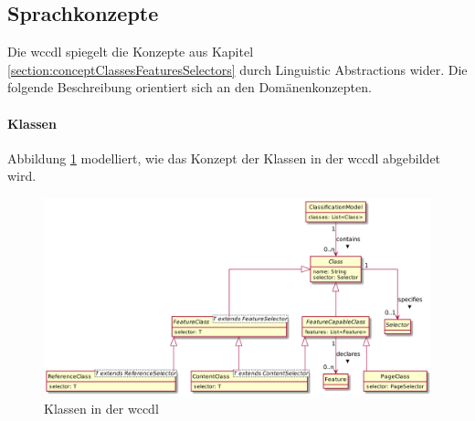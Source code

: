 \subsection{Sprachkonzepte}
    \label{solutionDetails:dslConcepts}
    Die \gls{wccdl} spiegelt die Konzepte aus
    Kapitel \ref{section:conceptClassesFeaturesSelectors}
    durch Linguistic Abstractions wider.
    Die folgende Beschreibung orientiert sich an den
    Domänenkonzepten.
    
    \paragraph{Klassen}
    Abbildung \ref{image:dslClasses} modelliert,
    wie das Konzept der Klassen in der \gls{wccdl} abgebildet wird.

    \begin{figure}[htb]
        \centering
        \includegraphics[scale=\imageScalingFactor]{../resources/dsl/classes.png}
        \caption{Klassen in der \acrshort{wccdl}}
        \label{image:dslClasses}
    \end{figure}

